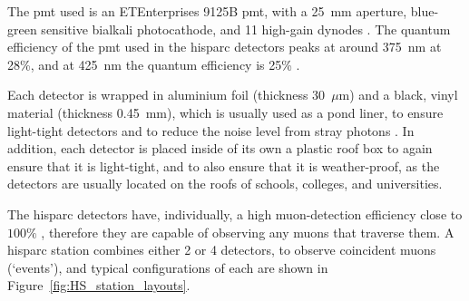 The \gls{pmt} used is an ETEnterprises 9125B \gls{pmt}, with a 25~mm aperture,  blue-green sensitive bialkali photocathode, and 11 high-gain dynodes \citep{bartels_hisparc_2012,et_enterprises_data_2020}. The quantum efficiency of the \gls{pmt} used in the \gls{hisparc} detectors peaks at around 375~nm at 28\%, and at 425~nm the quantum efficiency is 25\% \citep{fokkema_hisparc_2012}. 

Each detector is wrapped in aluminium foil (thickness 30~$\mu$m) and a black, vinyl material (thickness 0.45~mm), which is usually used as a pond liner, to ensure light-tight detectors and to reduce the noise level from stray photons \citep{van_dam_hisparc_2020}. In addition, each detector is placed inside of its own a plastic roof box to again ensure that it is light-tight, and to also ensure that it is weather-proof, as the detectors are usually located on the roofs of schools, colleges, and universities.

The \gls{hisparc} detectors have, individually, a high muon-detection
efficiency close to $100\%$ \citep{fokkema_hisparc_2012, van_dam_hisparc_2020}, therefore they are capable of observing any muons that traverse them. A \gls{hisparc} station combines either 2 or 4 detectors, to observe coincident muons (`events'), and typical configurations of each are shown in Figure~\ref{fig:HS_station_layouts}.


